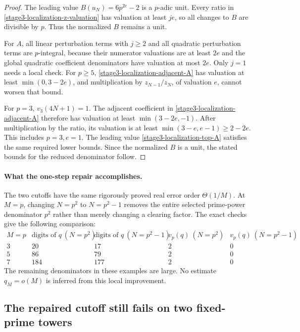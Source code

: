\documentclass[11pt,a4paper]{article}
\theoremstyle{definition}
\theoremstyle{remark}
\begin{document}
\begin{proof}
The leading value $B(u_N)=6p^{2e}-2$ is a $p$-adic unit.
Every ratio in \eqref{stage3-localization-z-valuation} has valuation
at least $je$, so all changes to $B$ are divisible by $p$.
Thus the normalized $B$ remains a unit.

For $A$, all linear perturbation terms with $j\ge2$ and all quadratic
perturbation terms are $p$-integral, because their numerator valuations
are at least $2e$ and the global quadratic coefficient denominators
have valuation at most $2e$. Only $j=1$ needs a local check.
For $p\ge5$, \eqref{stage3-localization-adjacent-A} has valuation at least
$\min(0,3-2e)$, and multiplication by $z_{N-1}/z_N$, of valuation $e$,
cannot worsen that bound.

For $p=3$, $v_3(4N+1)=1$. The adjacent coefficient in
\eqref{stage3-localization-adjacent-A} therefore has valuation at least
$\min(3-2e,-1)$. After multiplication by the ratio, its valuation is at
least $\min(3-e,e-1)\ge2-2e$. This includes $p=3,e=1$.
The leading value \eqref{stage3-localization-top-A} satisfies the same
required lower bounds. Since the normalized $B$ is a unit, the stated
bounds for the reduced denominator follow.
\end{proof}

\paragraph{What the one-step repair accomplishes.}
The two cutoffs have the same rigorously proved real error order
$\Theta(1/M)$. At $M=p$, changing $N=p^2$ to $N=p^2-1$ removes the
entire selected prime-power denominator $p^2$ rather than merely
changing a clearing factor. The exact checks give the following
comparison:
\[
\begin{array}{c|cc|cc}
 M=p&
 \text{digits of }q\ (N=p^2)&
 \text{digits of }q\ (N=p^2-1)&
 v_p(q)\ (N=p^2)&v_p(q)\ (N=p^2-1)\\ \hline
 3&20&17&2&0\\
 5&86&79&2&0\\
 7&184&177&2&0
\end{array}
\]
The remaining denominators in these examples are large.
No estimate $q_M=o(M)$ is inferred from this local improvement.



\subsection{The repaired cutoff still fails on two fixed-prime towers}
\label{unified-repaired-towers-section}
\end{document}
